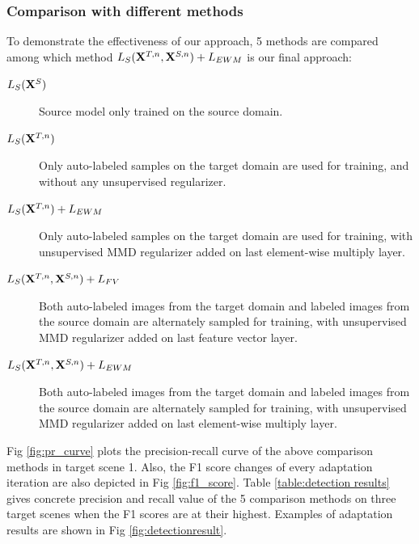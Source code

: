 \documentclass[runningheads]{llncs}
\begin{document}
\subsubsection{Comparison with different methods}
To demonstrate the effectiveness of our approach, 5 methods are compared among which method $L_{S}({\bf X}^{T,n},{\bf X}^{S,n})+L_{EWM}$ is our final approach:
\begin{description}
  \item[$L_{S}({\bf X}^{S})$] Source model only trained on the source domain.
  \item[$L_{S}({\bf X}^{T,n})$] Only auto-labeled samples on the target domain are used for training, and without any unsupervised regularizer.
  \item[$L_{S}({\bf X}^{T,n})+L_{EWM}$] Only auto-labeled samples on the target domain are used for training, with unsupervised MMD regularizer added on last element-wise multiply layer.
  \item[$L_{S}({\bf X}^{T,n},{\bf X}^{S,n})+L_{FV}$\cite{tzeng2014deep}] Both auto-labeled images from the target domain and labeled images from the source domain are alternately sampled for training, with unsupervised MMD regularizer added on last feature vector layer.
  \item[$L_{S}({\bf X}^{T,n},{\bf X}^{S,n})+L_{EWM}$] Both auto-labeled images from the target domain and labeled images from the source domain are alternately sampled for training, with unsupervised MMD regularizer added on last element-wise multiply layer.
\end{description}
Fig \ref{fig:pr_curve} plots the precision-recall curve of the above comparison methods in target scene 1. Also, the F1 score changes of every adaptation iteration are also depicted in Fig \ref{fig:f1_score}. Table \ref{table:detection results} gives concrete precision and recall value of the 5 comparison methods on three target scenes when the F1 scores are at their highest. Examples of adaptation results are shown in Fig \ref{fig:detectionresult}.
\end{document}
